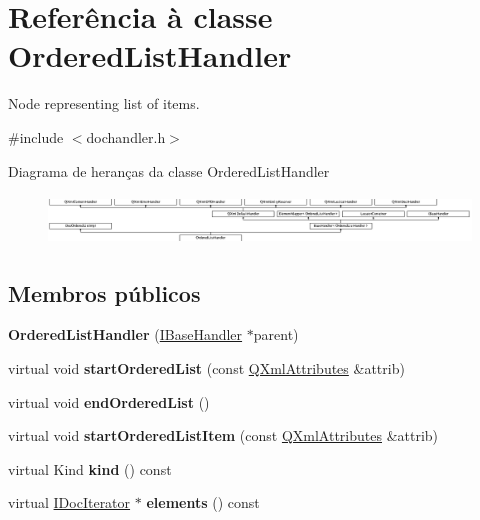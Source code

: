 \hypertarget{class_ordered_list_handler}{\section{Referência à classe Ordered\-List\-Handler}
\label{class_ordered_list_handler}
}


Node representing list of items.  




{\ttfamily \#include $<$dochandler.\-h$>$}

Diagrama de heranças da classe Ordered\-List\-Handler\begin{figure}[H]
\begin{center}
\leavevmode
\includegraphics[height=1.311475cm]{class_ordered_list_handler}
\end{center}
\end{figure}
\subsection*{Membros públicos}
\begin{DoxyCompactItemize}
\item 
\hypertarget{class_ordered_list_handler_acd6fbf8594d6402e724d4a4891abaf95}{{\bfseries Ordered\-List\-Handler} (\hyperlink{class_i_base_handler}{I\-Base\-Handler} $\ast$parent)}\label{class_ordered_list_handler_acd6fbf8594d6402e724d4a4891abaf95}

\item 
\hypertarget{class_ordered_list_handler_a367102893cc80ee76a6efd268fddcf50}{virtual void {\bfseries start\-Ordered\-List} (const \hyperlink{class_q_xml_attributes}{Q\-Xml\-Attributes} \&attrib)}\label{class_ordered_list_handler_a367102893cc80ee76a6efd268fddcf50}

\item 
\hypertarget{class_ordered_list_handler_ab999d69a6c4ab4fe4ee330d654ddfde2}{virtual void {\bfseries end\-Ordered\-List} ()}\label{class_ordered_list_handler_ab999d69a6c4ab4fe4ee330d654ddfde2}

\item 
\hypertarget{class_ordered_list_handler_ab1c7eb2ba21b9cd7194b8b4e18b0edc9}{virtual void {\bfseries start\-Ordered\-List\-Item} (const \hyperlink{class_q_xml_attributes}{Q\-Xml\-Attributes} \&attrib)}\label{class_ordered_list_handler_ab1c7eb2ba21b9cd7194b8b4e18b0edc9}

\item 
\hypertarget{class_ordered_list_handler_af8e62c8a81ddf2283205cc8955de50eb}{virtual Kind {\bfseries kind} () const }\label{class_ordered_list_handler_af8e62c8a81ddf2283205cc8955de50eb}

\item 
\hypertarget{class_ordered_list_handler_a3852144fad03681468c2c73e84c29c30}{virtual \hyperlink{class_i_doc_iterator}{I\-Doc\-Iterator} $\ast$ {\bfseries elements} () const }\label{class_ordered_list_handler_a3852144fad03681468c2c73e84c29c30}

\end{DoxyCompactItemize}
